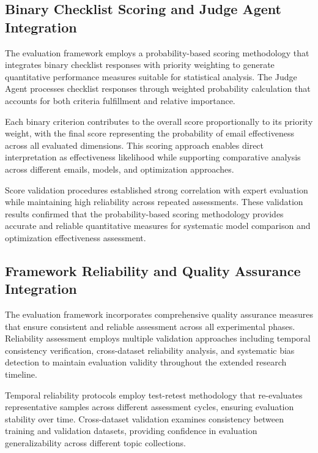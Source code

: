 \subsection{Binary Checklist Scoring and Judge Agent Integration}

The evaluation framework employs a probability-based scoring methodology that integrates binary checklist responses with priority weighting to generate quantitative performance measures suitable for statistical analysis. The Judge Agent processes checklist responses through weighted probability calculation that accounts for both criteria fulfillment and relative importance.

Each binary criterion contributes to the overall score proportionally to its priority weight, with the final score representing the probability of email effectiveness across all evaluated dimensions. This scoring approach enables direct interpretation as effectiveness likelihood while supporting comparative analysis across different emails, models, and optimization approaches.

Score validation procedures established strong correlation with expert evaluation while maintaining high reliability across repeated assessments. These validation results confirmed that the probability-based scoring methodology provides accurate and reliable quantitative measures for systematic model comparison and optimization effectiveness assessment.



\subsection{Framework Reliability and Quality Assurance Integration}

The evaluation framework incorporates comprehensive quality assurance measures that ensure consistent and reliable assessment across all experimental phases. Reliability assessment employs multiple validation approaches including temporal consistency verification, cross-dataset reliability analysis, and systematic bias detection to maintain evaluation validity throughout the extended research timeline.

Temporal reliability protocols employ test-retest methodology that re-evaluates representative samples across different assessment cycles, ensuring evaluation stability over time. Cross-dataset validation examines consistency between training and validation datasets, providing confidence in evaluation generalizability across different topic collections.

